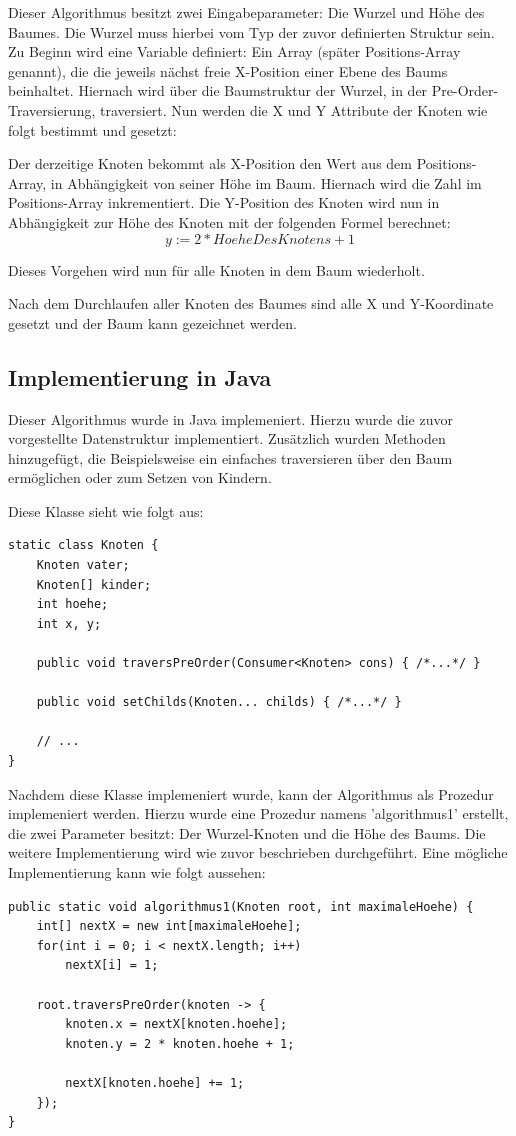 Dieser Algorithmus besitzt zwei Eingabeparameter: Die Wurzel und Höhe des Baumes.
Die Wurzel muss hierbei vom Typ der zuvor definierten Struktur sein. Zu Beginn wird eine Variable definiert:
Ein Array (später Positions-Array genannt), die die jeweils nächst freie X-Position einer Ebene des Baums beinhaltet.
Hiernach wird über die Baumstruktur der Wurzel, in der Pre-Order-Traversierung, traversiert.
Nun werden die X und Y Attribute der Knoten wie folgt bestimmt und gesetzt:

Der derzeitige Knoten bekommt als X-Position den Wert aus dem Positions-Array, in Abhängigkeit von seiner Höhe im Baum.
Hiernach wird die Zahl im Positions-Array inkrementiert. Die Y-Position des Knoten wird nun in Abhängigkeit zur Höhe des Knoten
mit der folgenden Formel berechnet: $$y := 2 * HoeheDesKnotens + 1$$

Dieses Vorgehen wird nun für alle Knoten in dem Baum wiederholt. 

Nach dem Durchlaufen aller Knoten des Baumes sind alle X und Y-Koordinate gesetzt und der Baum kann gezeichnet werden.

\subsection{Implementierung in Java}
Dieser Algorithmus wurde in Java implemeniert. Hierzu wurde die zuvor vorgestellte Datenstruktur
implementiert. Zusätzlich wurden Methoden hinzugefügt, die Beispielsweise
ein einfaches traversieren über den Baum ermöglichen oder zum Setzen von Kindern.

Diese Klasse sieht wie folgt aus:

\begin{lstlisting}
static class Knoten {
	Knoten vater;
	Knoten[] kinder;
	int hoehe;
	int x, y;

	public void traversPreOrder(Consumer<Knoten> cons) { /*...*/ }

	public void setChilds(Knoten... childs) { /*...*/ }

	// ...
}
\end{lstlisting}

Nachdem diese Klasse implemeniert wurde, kann der Algorithmus als Prozedur implemeniert werden.
Hierzu wurde eine Prozedur namens 'algorithmus1' erstellt, die zwei Parameter besitzt: Der Wurzel-Knoten
und die Höhe des Baums. Die weitere Implementierung wird wie zuvor beschrieben durchgeführt. Eine mögliche Implementierung
kann wie folgt aussehen:

\begin{lstlisting}
public static void algorithmus1(Knoten root, int maximaleHoehe) {
	int[] nextX = new int[maximaleHoehe];
	for(int i = 0; i < nextX.length; i++)
		nextX[i] = 1;

	root.traversPreOrder(knoten -> {
		knoten.x = nextX[knoten.hoehe];
		knoten.y = 2 * knoten.hoehe + 1;
		
		nextX[knoten.hoehe] += 1;
	});
}
\end{lstlisting}

